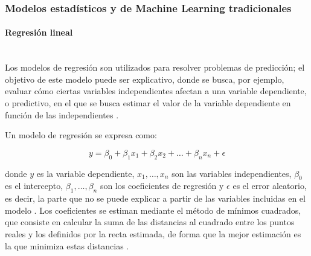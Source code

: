 




\subsubsection{Modelos estadísticos y de Machine Learning tradicionales}
    \paragraph{Regresión lineal}\mbox{}\\
    Los modelos de regresión son utilizados para resolver problemas de predicción; el objetivo de este modelo puede ser explicativo, donde se busca, por ejemplo, evaluar cómo ciertas variables independientes afectan a una variable dependiente, o predictivo, en el que se busca estimar el valor de la variable dependiente en función de las independientes \cite{pelaez2016modelos}.


    Un modelo de regresión se expresa como: 

    \begin{equation}
        y = \beta_0 + \beta_1 x_1 + \beta_2 x_2 + \dots + \beta_n x_n + \epsilon
    \end{equation}

    donde $y$ es la variable dependiente, $x_1, \dots, x_n$ son las variables independientes, $\beta_0$ es el intercepto, $\beta_1, \dots, \beta_n$ son los coeficientes de regresión y $\epsilon$ es el error aleatorio, es decir, la parte que no se puede explicar a partir de las variables incluidas en el modelo \cite{pelaez2016modelos}. Los coeficientes se estiman mediante el método de mínimos cuadrados, que consiste en calcular la suma de las distancias al cuadrado entre los puntos reales y los definidos por la recta estimada, de forma que la mejor estimación es la que minimiza estas distancias \cite{pelaez2016modelos}.

